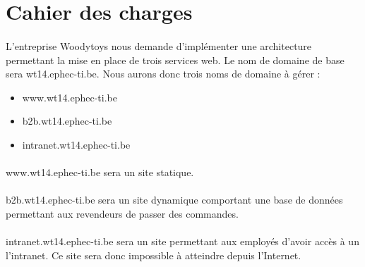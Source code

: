 \documentclass[a4paper,12pt]{article}
\begin{document}

\clearpage

\section{Cahier des charges}
	\paragraph{} L'entreprise Woodytoys nous demande d'implémenter une architecture permettant la mise en place de trois services web. Le nom de domaine de base sera wt14.ephec-ti.be. Nous aurons donc trois noms de domaine à gérer : \begin{itemize}
	\item www.wt14.ephec-ti.be
	\item b2b.wt14.ephec-ti.be
	\item intranet.wt14.ephec-ti.be
	\end{itemize}
	\paragraph{} www.wt14.ephec-ti.be sera un site statique.
	\paragraph{} b2b.wt14.ephec-ti.be sera un site dynamique comportant une base de données permettant aux revendeurs de passer des commandes.
	\paragraph{} intranet.wt14.ephec-ti.be sera un site permettant aux employés d'avoir accès à un l'intranet. Ce site sera donc impossible à atteindre depuis l'Internet.
\end{document}
